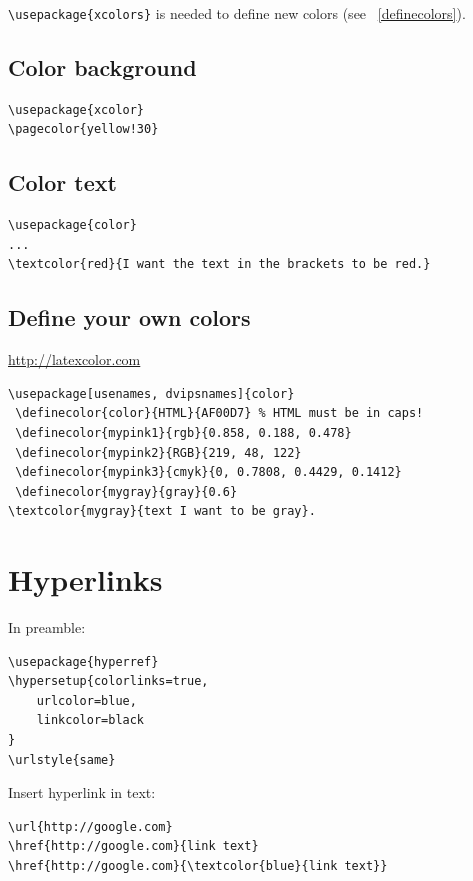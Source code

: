 \documentclass{article}
\begin{document}
\verb|\usepackage{xcolors}|
is needed to define new colors (see \SS{}~\ref{definecolors}).


\begin{minipage}{0.5\textwidth}
\subsection{Color background }
\begin{verbatim}
\usepackage{xcolor}
\pagecolor{yellow!30}
\end{verbatim}

\subsection{Color text}
\begin{verbatim}
\usepackage{color}
...
\textcolor{red}{I want the text in the brackets to be red.}
\end{verbatim}
\end{minipage}
\begin{minipage}{0.5\textwidth}
\subsection{Define your own colors}\label{ssec:definecolors}
\url{http://latexcolor.com}
\begin{verbatim}
\usepackage[usenames, dvipsnames]{color}
 \definecolor{color}{HTML}{AF00D7} % HTML must be in caps!
 \definecolor{mypink1}{rgb}{0.858, 0.188, 0.478}
 \definecolor{mypink2}{RGB}{219, 48, 122}
 \definecolor{mypink3}{cmyk}{0, 0.7808, 0.4429, 0.1412}
 \definecolor{mygray}{gray}{0.6}
\textcolor{mygray}{text I want to be gray}.
\end{verbatim}
\end{minipage}

\section{Hyperlinks}
In preamble:
\begin{verbatim}
\usepackage{hyperref}
\hypersetup{colorlinks=true,
    urlcolor=blue,
    linkcolor=black
}
\urlstyle{same}
\end{verbatim}

Insert hyperlink in text:
\begin{verbatim}
\url{http://google.com}
\href{http://google.com}{link text}
\href{http://google.com}{\textcolor{blue}{link text}}
\end{verbatim}
\end{document}
